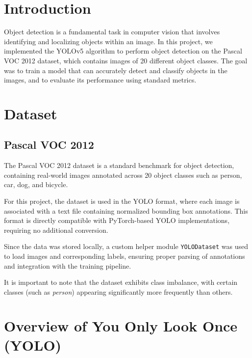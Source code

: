 \documentclass[10pt, a4paper]{article}
\begin{document}
\restoregeometry

\tableofcontents
\newpage
\section{Introduction}
Object detection is a fundamental task in computer vision that involves identifying and localizing objects within an image. In this project, we implemented the YOLOv5 algorithm to perform object detection on the Pascal VOC 2012 dataset, which contains images of 20 different object classes. The goal was to train a model that can accurately detect and classify objects in the images, and to evaluate its performance using standard metrics.


\section{Dataset}

\subsection{Pascal VOC 2012}

The Pascal VOC 2012 dataset is a standard benchmark for object detection, containing real-world images annotated across 20 object classes such as person, car, dog, and bicycle.

For this project, the dataset is used in the YOLO format, where each image is associated with a text file containing normalized bounding box annotations. This format is directly compatible with PyTorch-based YOLO implementations, requiring no additional conversion.

Since the data was stored locally, a custom helper module \texttt{YOLODataset} was used to load images and corresponding labels, ensuring proper parsing of annotations and integration with the training pipeline.

It is important to note that the dataset exhibits class imbalance, with certain classes (such as \textit{person}) appearing significantly more frequently than others. %

\section{Overview of You Only Look Once (YOLO)}
\end{document}
